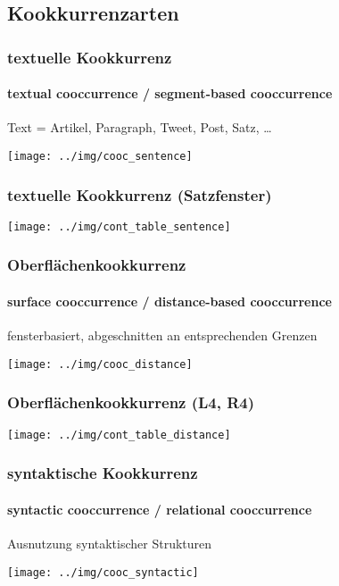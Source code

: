 \documentclass[aspectratio=1610,t]{beamer} %
\begin{document}
\subsection{Kookkurrenzarten}
\begin{frame}
  \frametitle{textuelle Kookkurrenz}
  \framesubtitle{textual cooccurrence / segment-based cooccurrence}
  \begin{center}
    Text = Artikel, Paragraph, Tweet, Post, Satz, \ldots

    \vspace{.5cm}
    \colorbox{blue!20!white}{%
      \texttt{[image: ../img/cooc\_sentence]}}
  \end{center}
\end{frame}

\begin{frame}[c]
  \frametitle{textuelle Kookkurrenz (Satzfenster)}

  \centering
  \texttt{[image: ../img/cont\_table\_sentence]}

\end{frame}

\begin{frame}
  \frametitle{Oberflächenkookkurrenz}
  \framesubtitle{surface cooccurrence / distance-based cooccurrence}
  \begin{center}
    fensterbasiert, abgeschnitten an entsprechenden Grenzen

    \vspace{.5cm}
    \colorbox{blue!20!white}{%
      \texttt{[image: ../img/cooc\_distance]}}
  \end{center}
\end{frame}

\begin{frame}[c]
  \frametitle{Oberflächenkookkurrenz (L4, R4)}

  \centering
  \texttt{[image: ../img/cont\_table\_distance]}

\end{frame}

\begin{frame}
  \frametitle{syntaktische Kookkurrenz}
  \framesubtitle{syntactic cooccurrence / relational cooccurrence}
  \begin{center}
    Ausnutzung syntaktischer Strukturen

    \vspace{.5cm}
    \colorbox{blue!20!white}{%
      \texttt{[image: ../img/cooc\_syntactic]}}
  \end{center}
\end{frame}
\end{document}

